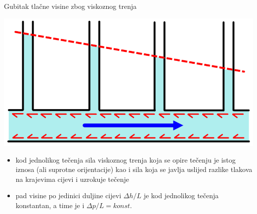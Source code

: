 \documentclass[croatian]{beamer}
\begin{document}
\begin{frame}{Gubitak tlačne visine zbog viskoznog trenja}

\begin{center}
\includegraphics[width=0.5\paperwidth]{slike/slika4.PNG}
\par\end{center}
\begin{itemize}
\item kod jednolikog tečenja sila viskoznog trenja koja se opire tečenju
je istog iznosa (ali suprotne orijentacije) kao i sila koja se javlja
uslijed razlike tlakova na krajevima cijevi i uzrokuje tečenje
\item pad visine po jedinici duljine cijevi $\Delta h/L$ je kod jednolikog
tečenja konstantan, a time je i $\Delta p/L=konst.$ 
\end{itemize}
\end{frame}
\end{document}
